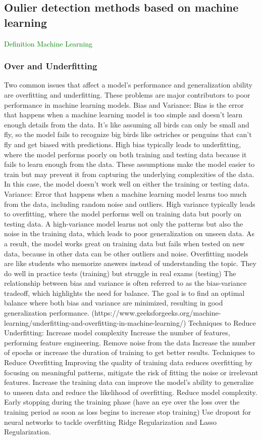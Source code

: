 \subsection{Oulier detection methods based on machine learning}
\textcolor{green}{Definition Machine Learning}


\subsubsection{Over and Underfitting}
Two common issues that affect a model's performance and generalization ability are overfitting and underfitting. 
These problems are major contributors to poor performance in machine learning models.
Bias and Variance: 
Bias is the error that happens when a machine learning model is too simple and doesn't learn enough details from the data. 
It's like assuming all birds can only be small and fly, so the model fails to recognize big birds like ostriches or penguins that can't fly and get biased with predictions.
High bias typically leads to underfitting, where the model performs poorly on both training and testing data because it fails to learn enough from the data.
These assumptions make the model easier to train but may prevent it from capturing the underlying complexities of the data.
In this case, the model doesn’t work well on either the training or testing data.
Variance: 
Error that happens when a machine learning model learns too much from the data, including random noise and outliers.
High variance typically leads to overfitting, where the model performs well on training data but poorly on testing data.
A high-variance model learns not only the patterns but also the noise in the training data, which leads to poor generalization on unseen data.
As a result, the model works great on training data but fails when tested on new data, because in other data can be other outliers and noise.
Overfitting models are like students who memorize answers instead of understanding the topic. 
They do well in practice tests (training) but struggle in real exams (testing)
The relationship between bias and variance is often referred to as the bias-variance tradeoff, which highlights the need for balance.
The goal is to find an optimal balance where both bias and variance are minimized, resulting in good generalization performance. 
(https://www.geeksforgeeks.org/machine-learning/underfitting-and-overfitting-in-machine-learning/)
Techniques to Reduce Underfitting: 
Increase model complexity
Increase the number of features, performing feature engineering.
Remove noise from the data
Increase the number of epochs or increase the duration of training to get better results.
Techniques to Reduce Overfitting
Improving the quality of training data reduces overfitting by focusing on meaningful patterns, mitigate the risk of fitting the noise or irrelevant features.
Increase the training data can improve the model's ability to generalize to unseen data and reduce the likelihood of overfitting.
Reduce model complexity.
Early stopping during the training phase (have an eye over the loss over the training period as soon as loss begins to increase stop training)
Use dropout for neural networks to tackle overfitting
Ridge Regularization and Lasso Regularization.


